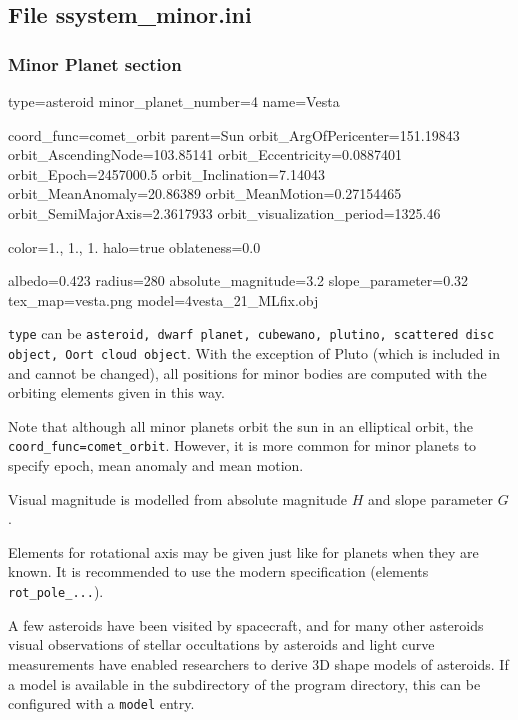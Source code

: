 \subsection{File ssystem\_minor.ini}
\label{sec:ssystem.ini:minor}

\subsubsection{Minor Planet section}
\label{sec:ssystem.ini:MinorPlanet}

\begin{configfile}
[4vesta]
type=asteroid  
minor_planet_number=4
name=Vesta

coord_func=comet_orbit
parent=Sun
orbit_ArgOfPericenter=151.19843
orbit_AscendingNode=103.85141
orbit_Eccentricity=0.0887401
orbit_Epoch=2457000.5
orbit_Inclination=7.14043
orbit_MeanAnomaly=20.86389
orbit_MeanMotion=0.27154465
orbit_SemiMajorAxis=2.3617933
orbit_visualization_period=1325.46

color=1., 1., 1.
halo=true
oblateness=0.0

albedo=0.423
radius=280
absolute_magnitude=3.2
slope_parameter=0.32
tex_map=vesta.png
model=4vesta_21_MLfix.obj
\end{configfile}

\texttt{type} can be \texttt{asteroid, dwarf planet, cubewano,
  plutino, scattered disc object, Oort cloud object}. With the
exception of Pluto (which is included in  and cannot be changed), 
all positions for minor bodies are computed with
the orbiting elements given in this way. 

Note that although all minor planets orbit the sun in an
elliptical orbit, the \texttt{coord\_func=comet\_orbit}. However, it
is more common for minor planets to specify epoch, mean anomaly and
mean motion.

Visual magnitude is modelled from absolute magnitude $H$ and slope parameter $G$.

Elements for rotational axis may be given just like for planets when
they are known. It is recommended to use the modern specification
(elements \texttt{rot\_pole\_...}).

A few asteroids have been visited by spacecraft, 
and for many other asteroids visual observations of stellar occultations 
by asteroids and light curve measurements have enabled researchers to derive 
3D shape models of asteroids. If a model is available in the  
subdirectory of the program directory, this can be configured with a \texttt{model} entry.

